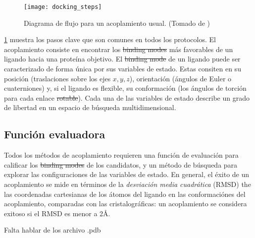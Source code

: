 \begin{figure}[h]
  \texttt{[image: docking\_steps]}
  \caption{Diagrama de flujo para un acoplamiento usual.
    (Tomado de \cite{kukol})}
  \label{fig:docking_flowchart}
\end{figure}
\ref{fig:docking_flowchart} muestra los pasos clave que son comunes en
todos los protocolos. El acoplamiento consiste en encontrar los
\sout{binding modes} más favorables de un ligando hacia una proteína
objetivo. El \sout{binding mode} de un ligando puede ser caracterizado
de forma única por sus variables de estado. Estas consiten en su
posición (traslaciones sobre los ejes $x, y, z$), orientación (ángulos
de Euler o cuaterniones) y, si el ligando es flexible, su conformación
(los ángulos de torción para cada enlace \sout{rotable}). Cada una de
las variables de estado describe un grado de libertad en un espacio de
búsqueda multidimensional.

\subsection{Función evaluadora}
Todos los métodos de acoplamiento requieren una función de evaluación
para calificar los \sout{binding modes} de los candidatos, y un método
de búsqueda para explorar las configuraciones de las variables de
estado. En general, el éxito de un acoplamiento se mide en términos de
la \textit{desviación media cuadrática} (RMSD) the las coordenadas
cartesianas de los átomos del ligando en las conformaciónes del
acoplamiento, comparadas con las cristalográficas: un acoplamiento se
considera exitoso si el RMSD es menor a 2\AA.

Falta hablar de los archivo .pdb
